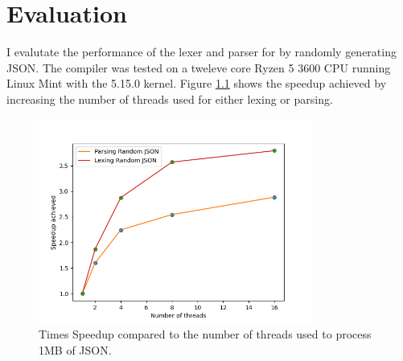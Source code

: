 \chapter{Evaluation} \label{evalandtesting}

I evalutate the performance of the lexer and parser for by randomly generating JSON.  The compiler
was tested on a tweleve core Ryzen 5 3600 CPU running Linux Mint with the 5.15.0 kernel. Figure
\ref{fig:json_graph} shows the speedup achieved by increasing the number of threads used for either
lexing or parsing.

\begin{figure}[h]
	\centering
    \includegraphics[width=0.8\textwidth]{images/graph.png}
	\caption{Times Speedup compared to the number of threads used to process 1MB of JSON.}
	\label{fig:json_graph}
\end{figure}



